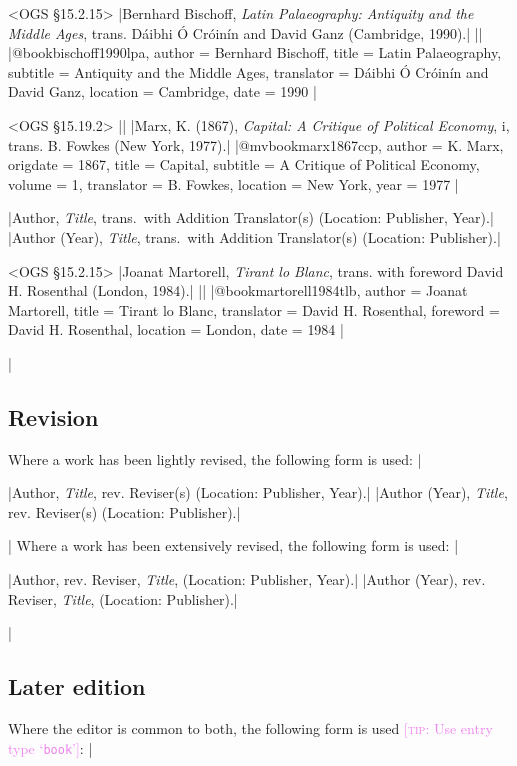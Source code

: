 \documentclass[extrafontsizes,11pt,a4paper,oneside]{memoir}
\newcommand*{\lit}[1]{\textsf{#1}}
\newcommand*{\code}[1]{`\texttt{#1}'}
\newcommand*{\aside}[1]{\textcolor{violet}{[\textsc{tip:} #1]}}
\begin{document}
\bibexample<OGS \S15.2.15>
|Bernhard Bischoff, \emph{Latin Palaeography: Antiquity and the Middle Ages}, trans. Dáibhi Ó Cróinín and David Ganz (Cambridge, 1990).|%
||%
|@book{bischoff1990lpa,
  author = {Bernhard Bischoff},
  title = {Latin Palaeography},
  subtitle = {Antiquity and the Middle Ages},
  translator = {Dáibhi Ó Cróinín and David Ganz},
  location = {Cambridge},
  date = {1990}
}|

\bibexample<OGS \S15.19.2>
||%
|Marx, K. (1867), \emph{Capital: A Critique of Political Economy}, i, trans. B. Fowkes (New York, 1977).|%
|@mvbook{marx1867ccp,
  author = {K. Marx},
  origdate = {1867},
  title = {Capital},
  subtitle = {A Critique of Political Economy},
  volume = {1},
  translator = {B. Fowkes},
  location = {New York},
  year = {1977}
}|

\specs
|Author, \emph{Title}, \lit{trans.\ with} Addition Translator(s) (Location: Publisher, Year).|%
|Author (Year), \emph{Title}, \lit{trans.\ with} Addition Translator(s) (Location: Publisher).|

\bibexample<OGS \S15.2.15>
|Joanat Martorell, \emph{Tirant lo Blanc}, trans. with foreword David H. Rosenthal (London, 1984).|%
||%
|@book{martorell1984tlb,
  author = {Joanat Martorell},
  title = {Tirant lo Blanc},
  translator = {David H. Rosenthal},
  foreword = {David H. Rosenthal},
  location = {London},
  date = {1984}
}|

\todoc|
\subsection{Revision}

Where a work has been lightly revised, the following form is used:
|

\specs
|Author, \emph{Title}, \lit{rev.} Reviser(s) (Location: Publisher, Year).|%
|Author (Year), \emph{Title}, \lit{rev.} Reviser(s) (Location: Publisher).|%

\todoc|
Where a work has been extensively revised, the following form is used:
|

\specs
|Author, \lit{rev.} Reviser, \emph{Title}, (Location: Publisher, Year).|%
|Author (Year), \lit{rev.} Reviser, \emph{Title}, (Location: Publisher).|

\todoc|
\subsection{Later edition}

Where the editor is common to both, the following form is used \aside{Use entry type \code{book}}:
|
\end{document}
